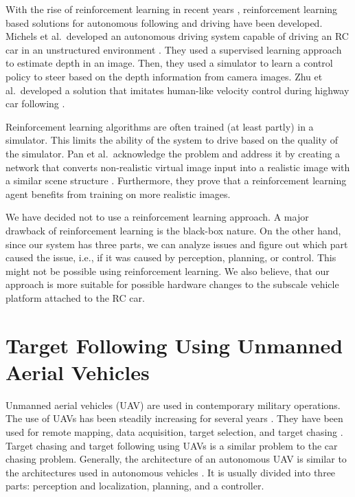 \documentclass{ctuthesis/ctuthesis}
\begin{document}
With the rise of reinforcement learning in recent years \cite{alphago,deepstack,alphastar}, reinforcement learning based solutions for autonomous following and driving have been developed. Michels et al.\ developed an autonomous driving system capable of driving an RC car in an unstructured environment \cite{RL_autonomous_driving}. They used a supervised learning approach to estimate depth in an image. Then, they used a simulator to learn a control policy to steer based on the depth information from camera images. Zhu et al.\ developed a solution that imitates human-like velocity control during highway car following \cite{RL_humanlike,RL_velocity}.\par


Reinforcement learning algorithms are often trained (at least partly) in a simulator. This limits the ability of the system to drive based on the quality of the simulator. Pan et al.\ acknowledge the problem and address it by creating a network that converts non-realistic virtual image input into a realistic image with a similar scene structure \cite{synthetic_images}. Furthermore, they prove that a reinforcement learning agent benefits from training on more realistic images.\par


We have decided not to use a reinforcement learning approach. A major drawback of reinforcement learning is the black-box nature. On the other hand, since our system has three parts, we can analyze issues and figure out which part caused the issue, i.e., if it was caused by perception, planning, or control. This might not be possible using reinforcement learning. We also believe, that our approach is more suitable for possible hardware changes to the subscale vehicle platform attached to the RC car. 





\section{Target Following Using Unmanned Aerial Vehicles}
Unmanned aerial vehicles (UAV) are used in contemporary military operations. The use of UAVs has been steadily increasing for several years \cite{UAV_good_or_bad}. They have been used for remote mapping, data acquisition, target selection, and target chasing \cite{UAV_good_or_bad,UAV_use}. Target chasing and target following using UAVs is a similar problem to the car chasing problem. Generally, the architecture of an autonomous UAV is similar to the architectures used in autonomous vehicles \cite{target_following_alg,uva_tracking_formula}. It is usually divided into three parts: perception and localization, planning, and a controller. \par
\end{document}
